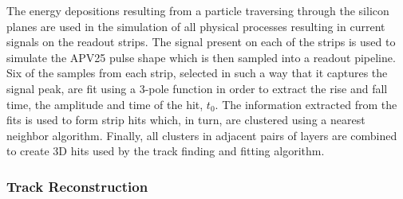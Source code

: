 The energy depositions resulting from a particle traversing through the silicon
planes are used in the simulation of all physical processes resulting in 
current signals on the readout strips.  The signal present on each of the 
strips is used to simulate 
the APV25 pulse shape which is then sampled into a readout pipeline. 
Six of the samples from each strip, selected in such a way that it captures
the signal peak, are fit using a 3-pole function in order to extract the
rise and fall time, the amplitude and time of the hit, $t_0$.  The information
extracted from the fits is used to form strip hits which, in turn, are clustered
using a nearest neighbor algorithm.
Finally, all clusters in adjacent pairs
of layers are combined to create 3D hits used by the track finding and fitting
algorithm.

\subsubsection{Track Reconstruction}

